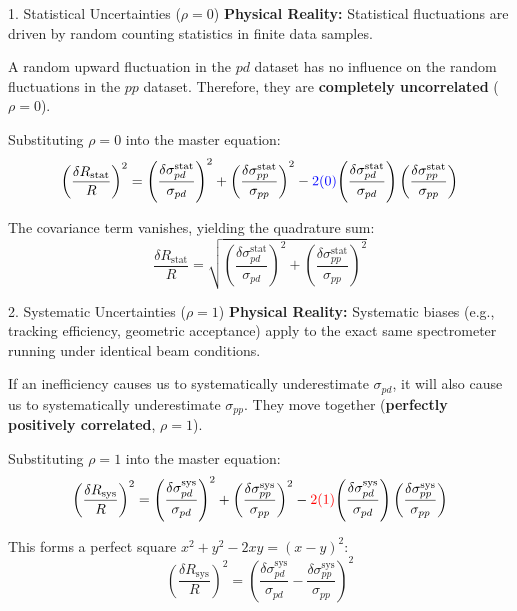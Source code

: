 \documentclass[aspectratio=169]{beamer}
\begin{document}
\begin{frame}{1. Statistical Uncertainties ($\rho = 0$)}
    \textbf{Physical Reality:} Statistical fluctuations are driven by random counting statistics in finite data samples. 
    
    \vspace{0.2cm}
    A random upward fluctuation in the $pd$ dataset has no influence on the random fluctuations in the $pp$ dataset. Therefore, they are \textbf{completely uncorrelated} ($\rho = 0$).
    
    \vspace{0.2cm}
    Substituting $\rho = 0$ into the master equation:
    \begin{equation*}
        \left(\frac{\delta R_{\text{stat}}}{R}\right)^2 = \left(\frac{\delta \sigma_{pd}^{\text{stat}}}{\sigma_{pd}}\right)^2 + \left(\frac{\delta \sigma_{pp}^{\text{stat}}}{\sigma_{pp}}\right)^2 - \color{blue}{2(0)}\color{black}{\left(\frac{\delta \sigma_{pd}^{\text{stat}}}{\sigma_{pd}}\right)\left(\frac{\delta \sigma_{pp}^{\text{stat}}}{\sigma_{pp}}\right)}
    \end{equation*}
    
    The covariance term vanishes, yielding the quadrature sum:
    \begin{equation}
        \frac{\delta R_{\text{stat}}}{R} = \sqrt{\left(\frac{\delta \sigma_{pd}^{\text{stat}}}{\sigma_{pd}}\right)^2 + \left(\frac{\delta \sigma_{pp}^{\text{stat}}}{\sigma_{pp}}\right)^2}
    \end{equation}
\end{frame}

\begin{frame}{2. Systematic Uncertainties ($\rho = 1$)}
    \textbf{Physical Reality:} Systematic biases (e.g., tracking efficiency, geometric acceptance) apply to the exact same spectrometer running under identical beam conditions.
    
    \vspace{0.2cm}
    If an inefficiency causes us to systematically underestimate $\sigma_{pd}$, it will also cause us to systematically underestimate $\sigma_{pp}$. They move together (\textbf{perfectly positively correlated}, $\rho = 1$).
    
    \vspace{0.2cm}
    Substituting $\rho = 1$ into the master equation:
    \begin{equation*}
        \left(\frac{\delta R_{\text{sys}}}{R}\right)^2 = \left(\frac{\delta \sigma_{pd}^{\text{sys}}}{\sigma_{pd}}\right)^2 + \left(\frac{\delta \sigma_{pp}^{\text{sys}}}{\sigma_{pp}}\right)^2 - \color{red}{2(1)}\color{black}{\left(\frac{\delta \sigma_{pd}^{\text{sys}}}{\sigma_{pd}}\right)\left(\frac{\delta \sigma_{pp}^{\text{sys}}}{\sigma_{pp}}\right)}
    \end{equation*}
    
    This forms a perfect square $x^2 + y^2 - 2xy = (x-y)^2$:
    \begin{equation}
        \left(\frac{\delta R_{\text{sys}}}{R}\right)^2 = \left( \frac{\delta \sigma_{pd}^{\text{sys}}}{\sigma_{pd}} - \frac{\delta \sigma_{pp}^{\text{sys}}}{\sigma_{pp}} \right)^2
    \end{equation}
\end{frame}
\end{document}
